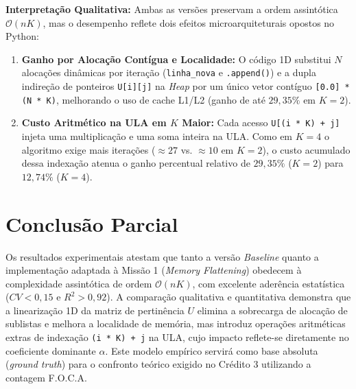 \documentclass[11pt,a4paper]{article}
\begin{document}
\textbf{Interpretação Qualitativa:} Ambas as versões preservam a ordem assintótica $\mathcal{O}(nK)$, mas o desempenho reflete dois efeitos microarquiteturais opostos no Python:
\begin{enumerate}
    \item \textbf{Ganho por Alocação Contígua e Localidade:} O código 1D substitui $N$ alocações dinâmicas por iteração (\texttt{linha\_nova} e \texttt{.append()}) e a dupla indireção de ponteiros \texttt{U[i][j]} na \textit{Heap} por um único vetor contíguo \texttt{[0.0] * (N * K)}, melhorando o uso de cache L1/L2 (ganho de até $29,35\%$ em $K=2$).
    \item \textbf{Custo Aritmético na ULA em $K$ Maior:} Cada acesso \texttt{U[(i * K) + j]} injeta uma multiplicação e uma soma inteira na ULA. Como em $K=4$ o algoritmo exige mais iterações ($\approx 27$ vs. $\approx 10$ em $K=2$), o custo acumulado dessa indexação atenua o ganho percentual relativo de $29,35\%$ ($K=2$) para $12,74\%$ ($K=4$).
\end{enumerate}

\section{Conclusão Parcial}
Os resultados experimentais atestam que tanto a versão \textit{Baseline} quanto a implementação adaptada à Missão 1 (\textit{Memory Flattening}) obedecem à complexidade assintótica de ordem $\mathcal{O}(nK)$, com excelente aderência estatística ($CV < 0,15$ e $R^2 > 0,92$). A comparação qualitativa e quantitativa demonstra que a linearização 1D da matriz de pertinência $U$ elimina a sobrecarga de alocação de sublistas e melhora a localidade de memória, mas introduz operações aritméticas extras de indexação \texttt{(i * K) + j} na ULA, cujo impacto reflete-se diretamente no coeficiente dominante $\alpha$. Este modelo empírico servirá como base absoluta (\textit{ground truth}) para o confronto teórico exigido no Crédito 3 utilizando a contagem F.O.C.A.
\end{document}
